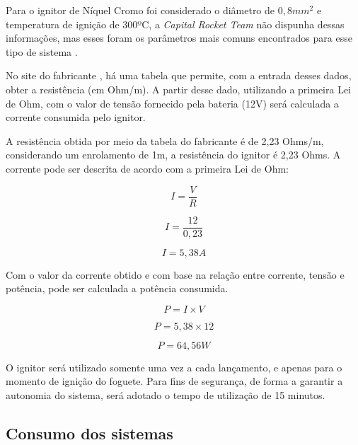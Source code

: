 Para o ignitor de Níquel Cromo foi considerado o diâmetro de $0,8 mm^2$ e temperatura de ignição de 300ºC, a \textit{Capital Rocket Team} não dispunha dessas informações, mas esses foram os parâmetros mais comuns encontrados para esse tipo de sistema \cite{edufer2020}.  

No site do fabricante \cite{ignitor}, há uma tabela que permite, com a entrada desses dados, obter a resistência (em Ohm/m). A partir desse dado, utilizando a primeira Lei de Ohm, com o valor de tensão fornecido pela bateria (12V) será calculada a corrente consumida pelo ignitor.

A resistência obtida por meio da tabela do fabricante é de 2,23 Ohms/m, considerando um enrolamento de 1m, a resistência do ignitor é 2,23 Ohms. A corrente pode ser descrita de acordo com a primeira Lei de Ohm:

\begin{center}
\begin{equation}
 I = \frac{V} {R} 
 \end{equation}
 
 \begin{equation}
 I = \frac{12} {0,23}
 \end{equation}
 
 \begin{equation}
 I = 5,38 A
\end{equation}
\end{center}

Com o valor da corrente obtido e com base na relação entre corrente, tensão e potência, pode ser calculada a potência consumida.

\begin{center}
\begin{equation}\label{m}
	P = I \times V 
    \end{equation}
    
 \begin{equation}
  P =  5,38 \times 12 
  \end{equation}
  
  \begin{equation}
  P = 64,56 W 
\end{equation}
\end{center}

O ignitor será utilizado somente uma vez a cada lançamento, e apenas para o momento de ignição do foguete. Para fins de segurança, de forma a garantir a autonomia do sistema, será adotado o tempo de utilização de 15 minutos.

\subsection{Consumo dos sistemas}

